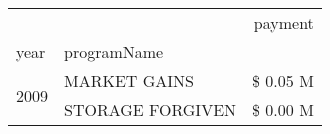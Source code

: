 \begin{tabular}{llr}
\toprule
 &  & payment \\
year & programName &  \\
\midrule
\multirow[t]{2}{*}{2009} & MARKET GAINS & \$ 0.05 M \\
 & STORAGE FORGIVEN & \$ 0.00 M \\
\cline{1-3}
\bottomrule
\end{tabular}
